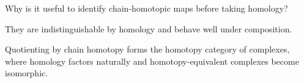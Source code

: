 \begin{exercise}\label{exr:viii22-ped-16}
Why is it useful to identify chain-homotopic maps before taking homology?
\end{exercise}
\begin{hint}
They are indistinguishable by homology and behave well under composition.
\end{hint}
\begin{solution}
Quotienting by chain homotopy forms the homotopy category of complexes, where homology factors naturally and homotopy-equivalent complexes become isomorphic.
\end{solution}

